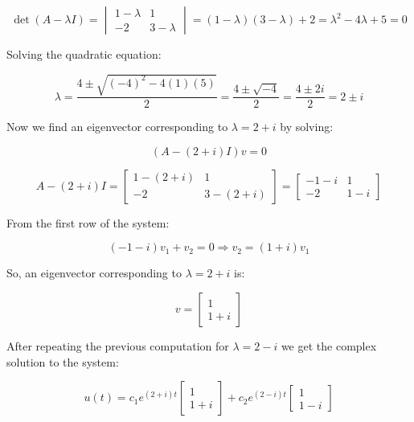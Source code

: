 \[
    \det(A - \lambda I) = 
    \begin{vmatrix}
    1 - \lambda & 1 \\
    -2 & 3 - \lambda
    \end{vmatrix}
    = (1 - \lambda)(3 - \lambda) + 2 = \lambda^2 - 4\lambda + 5 = 0
\]

Solving the quadratic equation:

\[
    \lambda = \frac{4 \pm \sqrt{(-4)^2 - 4(1)(5)}}{2} = \frac{4 \pm \sqrt{-4}}{2} = \frac{4 \pm 2i}{2} 
    = 2 \pm i
\]

Now we find an eigenvector corresponding to \( \lambda = 2 + i \) by solving:

\[
    (A - (2 + i)I)v = 0
\]

\[
    A - (2 + i)I = \begin{bmatrix} 1 - (2 + i) & 1 \\ -2 & 3 - (2 + i) \end{bmatrix}
    = \begin{bmatrix} -1 - i & 1 \\ -2 & 1 - i \end{bmatrix}
\]

From the first row of the system:

\[
    (-1 - i)v_1 + v_2 = 0 \Rightarrow v_2 = (1 + i)v_1
\]

So, an eigenvector corresponding to \( \lambda = 2 + i \) is:

\[
    v = \begin{bmatrix} 1 \\ 1 + i \end{bmatrix}
\]

After repeating the previous computation for \(\lambda = 2 - i\) we get the complex solution to the 
system:

\[
    u(t) = c_1 e^{(2 + i)t} \begin{bmatrix} 1 \\ 1 + i \end{bmatrix}
    + c_2 e^{(2 - i)t} \begin{bmatrix} 1 \\ 1 - i \end{bmatrix}
\]

